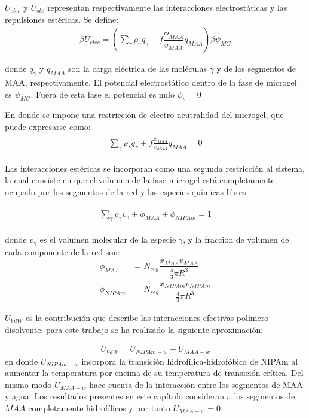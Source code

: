 $U_{elec}$ y $U_{ste}$ representan respectivamente las interacciones electrost\'aticas y las repulsiones est\'ericas.
Se define: 
\begin{align}
	  \beta U_{elec} =\left(\sum_{\gamma } {\rho_\gamma q_\gamma + f\dfrac{\phi_{MAA}}{v_{MAA}}q_{MAA}}\right)\beta\psi_{MG}
\end{align}

\noindent donde $q_\gamma$ y $q_{MAA}$ son la carga el\'ectrica de las moléculas $\gamma$ y de los segmentos de MAA, respectivamente.
El potencial electrost\'atico dentro de la fase de microgel es $\psi_{MG}$. Fuera de esta fase el potencial es nulo $\psi_s = 0$

En donde se impone una restricci\'on de electro-neutralidad del microgel, que puede expresarse como:
%
%
\begin{align}
	\begin{aligned}
		\sum_{\gamma  } \rho_\gamma q_\gamma + f\frac{\phi_{MAA}}{v_{MAA}}q_{MAA}=0
	\end{aligned}
	\label{eq:gel:charge-neutrality}
\end{align}

Las interacciones est\'ericas se incorporan como una segunda restricci\'on al sistema, la cual consiste en que el volumen de la fase microgel est\'a completamente ocupado por los segmentos de la red y las especies qu\'imicas libres.

%
\begin{align}
	\begin{aligned}
		\sum_{\gamma } \rho_\gamma v_\gamma  + \phi_{MAA} + \phi_{NIPAm} = 1
	\end{aligned}
	\label{eq:gel:packing}
\end{align}



\noindent donde $v_\gamma$  es el volumen molecular de la especie $\gamma$, y la fracci\'on de volumen de cada componente de la red son: 
%
%
\begin{align}
	\phi_{MAA}&=N_{seg}\dfrac{x_{MAA}v_{MAA}}{\frac{4}{3}\pi R^3}\\
	\phi_{NIPAm}&=N_{seg}\dfrac{x_{NIPAm}v_{NIPAm}}{\frac{4}{3}\pi R^3}
\end{align}



$U_{VdW}$ es la contribuci\'on que describe las interacciones efectivas pol\'imero-disolvente; para este trabajo  se ha realizado la siguiente aproximaci\'on: 

\begin{align}
	U_{VdW} = U_{NIPAm-w} + U_{MAA-w}
\end{align}
\noindent en donde $U_{NIPAm-w}$ incorpora la transici\'on hidrofílica-hidrof\'obica de NIPAm al aumentar la temperatura por encima de su temperatura de transici\'on cr\'itica. 
Del mismo modo $U_{MAA-w}$ hace cuenta de la interacci\'on entre los segmentos de MAA y agua.
Los resultados presentes en este cap\'itulo consideran a los segmentos de $MAA$ completamente hidrof\'ilicos y por tanto $U_{MAA-w} = 0$

